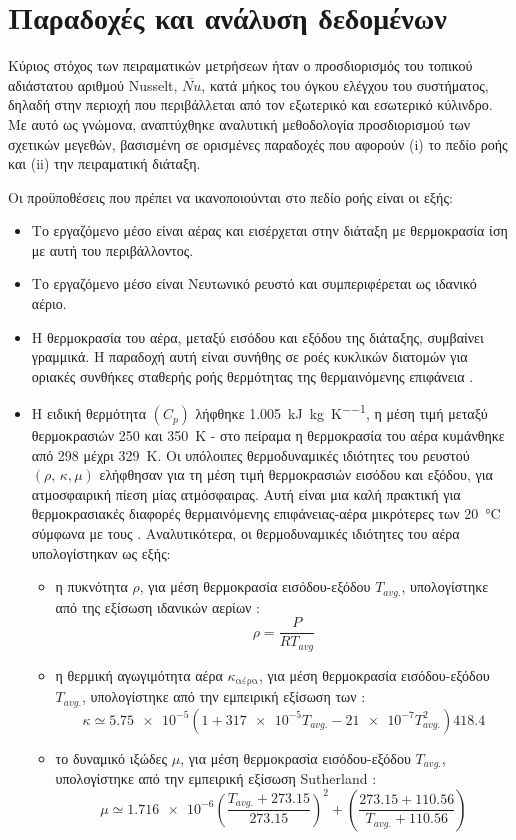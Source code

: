 \section{Παραδοχές και ανάλυση δεδομένων}

\noindent Κύριος στόχος των πειραματικών μετρήσεων ήταν ο προσδιορισμός του τοπικού αδιάστατου αριθμού Nusselt, $\overline{Nu}$, κατά μήκος του όγκου ελέγχου του συστήματος, δηλαδή στην περιοχή που περιβάλλεται από τον εξωτερικό και εσωτερικό κύλινδρο. Με αυτό ως γνώμονα, αναπτύχθηκε αναλυτική μεθοδολογία προσδιορισμού των σχετικών μεγεθών, βασισμένη σε ορισμένες παραδοχές που αφορούν (i) το πεδίο ροής και (ii) την πειραματική διάταξη.

Οι προϋποθέσεις που πρέπει να ικανοποιούνται στο πεδίο ροής είναι οι εξής:

\begin{itemize}
\item Το εργαζόμενο μέσο είναι αέρας και εισέρχεται στην διάταξη με θερμοκρασία ίση με αυτή του περιβάλλοντος.
\item Το εργαζόμενο μέσο είναι Νευτωνικό ρευστό και συμπεριφέρεται ως ιδανικό αέριο.
\item H θερμοκρασία του αέρα, μεταξύ εισόδου και εξόδου της διάταξης, συμβαίνει γραμμικά. Η παραδοχή αυτή είναι συνήθης σε ροές κυκλικών διατομών για οριακές συνθήκες σταθερής ροής θερμότητας της θερμαινόμενης επιφάνεια \cite{2011_Bergman_BOOK}.
\item Η ειδική θερμότητα $\left(C_p\right)$ λήφθηκε \qty{1.005}{\kilo\joule\per\kilogram\per\kelvin}, η μέση τιμή μεταξύ θερμοκρασιών 250 και \qty{350}{\kelvin} \cite{1955_Hilsenrath_BOOK} - στο πείραμα η θερμοκρασία του αέρα κυμάνθηκε από 298 μέχρι \qty{329}{\kelvin}. Οι υπόλοιπες θερμοδυναμικές ιδιότητες του ρευστού $\left(\rho, \, \kappa, \mu \right)$ ελήφθησαν για τη μέση τιμή θερμοκρασιών εισόδου και εξόδου, για ατμοσφαιρική πίεση μίας ατμόσφαιρας. Αυτή είναι μια καλή πρακτική για θερμοκρασιακές διαφορές θερμαινόμενης επιφάνειας-αέρα μικρότερες των \qty{20}{\degreeCelsius} σύμφωνα με τους \citeauthor{1993_Kays_BOOK} \cite{1993_Kays_BOOK}. Αναλυτικότερα, οι θερμοδυναμικές ιδιότητες του αέρα υπολογίστηκαν ως εξής:

\begin{itemize}
\item η πυκνότητα $\rho$, για μέση θερμοκρασία εισόδου-εξόδου $T_{avg.}$, υπολογίστηκε από της εξίσωση ιδανικών αερίων \cite{Φιλιός2020}:$$\rho = \displaystyle\frac{P}{R T_{avg}}$$
\item η θερμική αγωγιμότητα αέρα $\kappa_{\text{αέρα}}$, για μέση θερμοκρασία εισόδου-εξόδου $T_{avg.}$, υπολογίστηκε από την εμπειρική εξίσωση των \citeauthor{1951_Kannuluik} \cite{1951_Kannuluik}:$$\kappa \simeq \num{5.75e-5}\left(1 + \num{317e-5}  T_{avg.} - \num{21e-7} T_{avg.} ^ 2\right) 418.4$$
\item το δυναμικό ιξώδες $\mu$, για μέση θερμοκρασία εισόδου-εξόδου $T_{avg.}$, υπολογίστηκε από την εμπειρική εξίσωση Sutherland \cite{Φιλιός2020}:$$\mu \simeq \num{1.716e-6} \left(\displaystyle\frac{T_{avg.} + 273.15}{273.15}\right) ^ 2 + \left(\displaystyle\frac{273.15 + 110.56}{T_{avg.} + 110.56}\right)$$
\end{itemize}


\end{itemize}
